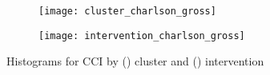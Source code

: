 \begin{figure}
    \centering
    \begin{subfigure}{\halfimgwidth}
        \texttt{[image: cluster\_charlson\_gross]}
        \caption{}\label{fig:cluster_charlson}
    \end{subfigure}\hfill%
    \begin{subfigure}{\halfimgwidth}
        \texttt{[image: intervention\_charlson\_gross]}
        \caption{}\label{fig:intervention_charlson}
    \end{subfigure}
    \caption{%
        Histograms for CCI by () cluster and
        () intervention
    }\label{fig:charlson_hist}
\end{figure}


